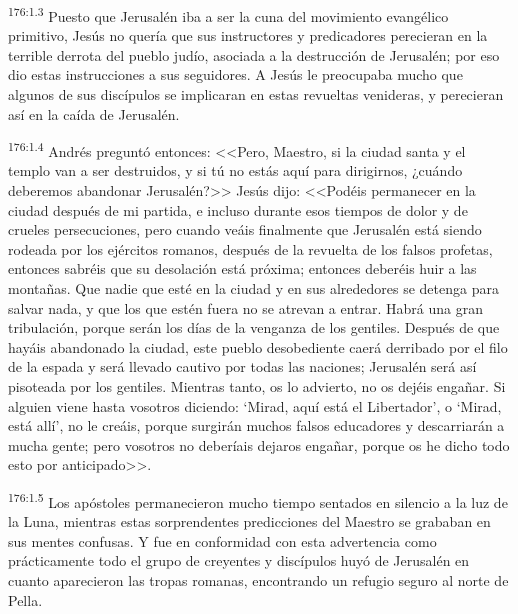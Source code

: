 \par 
\textsuperscript{176:1.3} Puesto que Jerusalén iba a ser la cuna del movimiento evangélico primitivo, Jesús no quería que sus instructores y predicadores perecieran en la terrible derrota del pueblo judío, asociada a la destrucción de Jerusalén; por eso dio estas instrucciones a sus seguidores. A Jesús le preocupaba mucho que algunos de sus discípulos se implicaran en estas revueltas venideras, y perecieran así en la caída de Jerusalén.

\par 
\textsuperscript{176:1.4} Andrés preguntó entonces: <<Pero, Maestro, si la ciudad santa y el templo van a ser destruidos, y si tú no estás aquí para dirigirnos, ¿cuándo deberemos abandonar Jerusalén?>> Jesús dijo: <<Podéis permanecer en la ciudad después de mi partida, e incluso durante esos tiempos de dolor y de crueles persecuciones, pero cuando veáis finalmente que Jerusalén está siendo rodeada por los ejércitos romanos, después de la revuelta de los falsos profetas, entonces sabréis que su desolación está próxima; entonces deberéis huir a las montañas. Que nadie que esté en la ciudad y en sus alrededores se detenga para salvar nada, y que los que estén fuera no se atrevan a entrar. Habrá una gran tribulación, porque serán los días de la venganza de los gentiles. Después de que hayáis abandonado la ciudad, este pueblo desobediente caerá derribado por el filo de la espada y será llevado cautivo por todas las naciones; Jerusalén será así pisoteada por los gentiles. Mientras tanto, os lo advierto, no os dejéis engañar. Si alguien viene hasta vosotros diciendo: `Mirad, aquí está el Libertador', o `Mirad, está allí', no le creáis, porque surgirán muchos falsos educadores y descarriarán a mucha gente; pero vosotros no deberíais dejaros engañar, porque os he dicho todo esto por anticipado>>.

\par 
\textsuperscript{176:1.5} Los apóstoles permanecieron mucho tiempo sentados en silencio a la luz de la Luna, mientras estas sorprendentes predicciones del Maestro se grababan en sus mentes confusas. Y fue en conformidad con esta advertencia como prácticamente todo el grupo de creyentes y discípulos huyó de Jerusalén en cuanto aparecieron las tropas romanas, encontrando un refugio seguro al norte de Pella.

